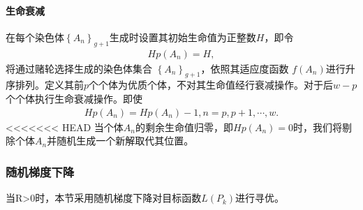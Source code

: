 \documentclass{whutmod}
\begin{document}
\begin{table}[H]
\begin{tablenotes}
		\paragraph{生命衰减}
		在每个染色体$\left \{A_n  \right \}_{g+1}$生成时设置其初始生命值为正整数$H$，即令
	\begin{gather}
	Hp(A_n)=H,
	\end{gather}
	将通过赌轮选择生成的染色体集合 $\left \{A_n  \right \}_{g+1}$，依照其适应度函数
	$f(A_n)$进行升序排列。定义其前$p$个个体为优质个体，不对其生命值经行衰减操作。对于后$w-p$个个体执行生命衰减操作。即使
		\begin{gather}
		Hp(A_n)=Hp(A_n)-1,n=p,p+1,\cdots,w.
		\end{gather}
<<<<<<< HEAD
    当个体$A_n$的剩余生命值归零，即$Hp(A_n)=0$时，我们将剔除个体$A_n$并随机生成一个新解取代其位置。

	\subsubsection{随机梯度下降}	
    	 当R>0时，本节采用随机梯度下降对目标函数$L(P_k)$进行寻优。


\end{tablenotes}
\end{table}
\end{document}
